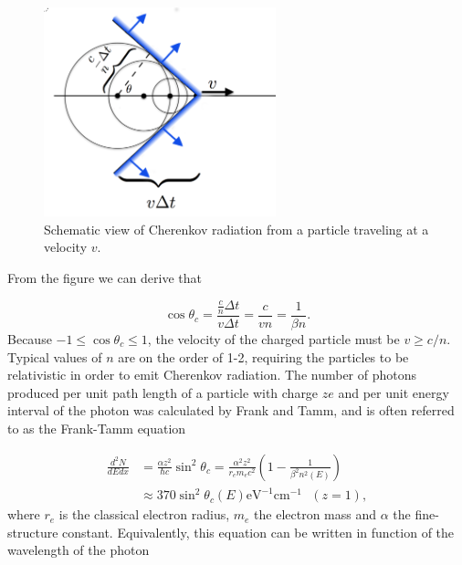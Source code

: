 \begin{figure}[ht]
\centering
\includegraphics[width=0.6\textwidth]{chapter4/img/cherenkov2.png}
\caption{Schematic view of Cherenkov radiation from a particle traveling at a velocity $v$.}
\label{fig:cherenkov}
\end{figure}

From the figure we can derive that

\begin{equation}
\cos\theta_c = \frac{\frac{c}{n} \Delta t}{v \Delta t} = \frac{c}{vn} = \frac{1}{\beta n}.
\end{equation} 
Because $-1 \leq \cos\theta_c \leq 1$, the velocity of the charged particle must be $v \geq c/n$. Typical values of $n$ are on the order of 1-2, requiring the particles to be relativistic in order to emit Cherenkov radiation. The number of photons produced per unit path length of a particle with charge $ze$ and per unit energy interval of the photon was calculated by Frank and Tamm, and is often referred to as the Frank-Tamm equation \cite{PDG2018url}

\begin{equation}
\begin{split}
\frac{d^2N}{dE dx} &= \frac{\alpha z^2}{\hbar c} \sin^2 \theta_c = \frac{\alpha^2 z^2}{r_e m_e c^2} \left( 1 - \frac{1}{\beta^2 n^2\left(E\right)} \right)\\
&\approx 370 \sin^2 \theta_c \left(E\right) \textrm{eV}^{-1} \textrm{cm}^{-1} \ \ \ \left( z =1\right),
\end{split}
\end{equation}
where $r_e$ is the classical electron radius, $m_e$ the electron mass and $\alpha$ the fine-structure constant. Equivalently, this equation can be written in function of the wavelength of the photon

